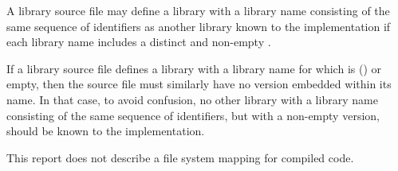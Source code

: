 \documentclass[twoside,twocolumn]{algol60}
\begin{document}
A library source file may define a library with a library name consisting
of the same sequence of identifiers as another library known to the 
implementation if each library name includes a distinct and non-empty 
.

If a library source file defines a library with a library name for which 
 is {\cf()} or empty, then the source file must similarly 
have no version embedded within its name.  In that case, to avoid 
confusion, no other library with a library name consisting of the same
sequence of identifiers, but with a non-empty version, should be known 
to the implementation.

This report does not describe a file system mapping for compiled code.



\renewcommand{\bibname}{References}




\vfill\eject

%
\end{document}
